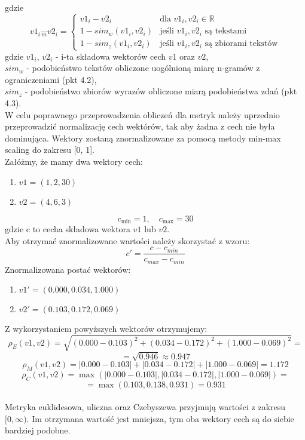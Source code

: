 \documentclass{article}
\begin{document}
gdzie 
\[
    v1_i \underset{m}{-} v2_i = 
    \begin{cases}
    v1_i - v2_i & \text{dla } v1_i, v2_i \in \mathbb{R} \\
    1 - sim_w(v1_i, v2_i) & \text{jeśli } v1_i, v2_i \text{ są tekstami}\\
    1 - sim_z(v1_i, v2_i) & \text{jeśli } v1_i, v2_i \text{ są zbiorami tekstów}
    \end{cases}
\]
gdzie \(v1_i\), \(v2_i\) - i-ta składowa wektorów cech \(v1\) oraz \(v2\),\\ \(sim_w\) - podobieństwo tekstów obliczone uogólnioną miarę n-gramów z ograniczeniami (pkt 4.2),\\ \(sim_z\) - podobieństwo zbiorów wyrazów obliczone miarą podobieństwa zdań (pkt 4.3). \\
W celu poprawnego przeprowadzenia obliczeń dla metryk należy uprzednio przeprowadzić normalizację cech wektórów, tak aby żadna z cech nie była dominująca. Wektory zostaną znormalizowane za pomocą metody min-max scaling do zakresu [0, 1].\\
Załóżmy, że mamy dwa wektory cech:
\begin{enumerate}
    \item \(v1 = (1, 2, 30)\)
    \item \(v2 = (4, 6, 3)\)
\end{enumerate}
\[
    c_{\min} = 1, \quad c_{\max} = 30
\]
gdzie c to cecha składowa wektora \(v1\) lub \(v2\). \\
Aby otrzymać znormalizowane wartości należy skorzystać z wzoru:
\begin{equation}
    c' = \frac{c - c_{min}}{c_{max} - c_{min}}
\end{equation}
Znormalizowana postać wektorów:
\begin{enumerate}
    \item \(v1' = (0.000, 0.034, 1.000)\)
    \item \(v2' = (0.103, 0.172, 0.069)\)
\end{enumerate} 
Z wykorzystaniem powyższych wektorów otrzymujemy:
\[
     \rho_E(v1, v2) = \sqrt{(0.000 - 0.103)^2 + (0.034 - 0.172)^2 + (1.000 - 0.069)^2} = 
\]
\[
       = \sqrt{0.946} \approx 0.947
\]
\[
    \rho_M(v1, v2) = |0.000 - 0.103| + |0.034 - 0.172| + |1.000 - 0.069| = 1.172
\]
\[
    \rho_C(v1, v2) = \max(|0.000 - 0.103|, |0.034 - 0.172|, |1.000 - 0.069|) = 
\]
\[
     = \max(0.103, 0.138, 0.931) = 0.931
\]
\\
Metryka euklidesowa, uliczna oraz Czebyszewa przyjmują wartości z zakresu \([0, \infty)\). Im otrzymana wartość jest mniejsza, tym oba wektory cech są do siebie bardziej podobne.
\end{document}
